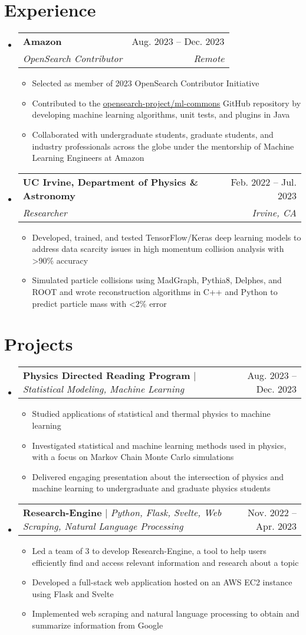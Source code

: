\documentclass[letterpaper,11pt]{article}
\makeatletter
\newcommand{\resumeItem}[1]{
  \item\small{
    {#1 \vspace{-2pt}}
  }
}
\newcommand{\resumeSubheading}[4]{
  \vspace{-2pt}\item
    \begin{tabular*}{0.97\textwidth}[t]{l@{\extracolsep{\fill}}r}
      \textbf{#1} & #2 \\
      \textit{\small#3} & \textit{\small #4} \\
    \end{tabular*}\vspace{-7pt}
}
\newcommand{\resumeProjectHeading}[2]{
    \item
    \begin{tabular*}{0.97\textwidth}{l@{\extracolsep{\fill}}r}
      \small#1 & #2 \\
    \end{tabular*}\vspace{-7pt}
}
\newcommand{\resumeSubHeadingListStart}{\begin{itemize}[leftmargin=0.15in, label={}]}
\newcommand{\resumeSubHeadingListEnd}{\end{itemize}}
\newcommand{\resumeItemListStart}{\begin{itemize}}
\newcommand{\resumeItemListEnd}{\end{itemize}\vspace{-5pt}}
\makeatother
\begin{document}
\section{Experience}
  \resumeSubHeadingListStart
    \resumeSubheading
      {Amazon}{Aug. 2023 -- Dec. 2023}
      {OpenSearch Contributor}{Remote}
      \resumeItemListStart
        \resumeItem{Selected as member of 2023 OpenSearch Contributor Initiative}
        \resumeItem{Contributed to the \href{https://github.com/opensearch-project/ml-commons/}{\underline{opensearch-project/ml-commons}} GitHub repository by developing machine learning algorithms, unit tests, and plugins in Java}
        \resumeItem{Collaborated with undergraduate students, graduate students, and industry professionals across the globe under the mentorship of Machine Learning Engineers at Amazon}
      \resumeItemListEnd
  \resumeSubHeadingListEnd

  \resumeSubHeadingListStart
    \resumeSubheading
      {UC Irvine, Department of Physics \& Astronomy}{Feb. 2022 -- Jul. 2023}
      {Researcher}{Irvine, CA}
      \resumeItemListStart
        \resumeItem{Developed, trained, and tested TensorFlow/Keras deep learning models to address data scarcity issues in high momentum collision analysis with \textgreater 90\% accuracy}
        \resumeItem{Simulated particle collisions using MadGraph, Pythia8, Delphes, and ROOT and wrote reconstruction algorithms in C++ and Python to predict particle mass with \textless 2\% error}
      \resumeItemListEnd
  \resumeSubHeadingListEnd

\section{Projects}
  \resumeSubHeadingListStart
    \resumeProjectHeading
      {\textbf{Physics Directed Reading Program} $|$ \emph{Statistical Modeling, Machine Learning}}{Aug. 2023 -- Dec. 2023}
      \resumeItemListStart
        \resumeItem{Studied applications of statistical and thermal physics to machine learning}
        \resumeItem{Investigated statistical and machine learning methods used in physics, with a focus on Markov Chain Monte Carlo simulations}
        \resumeItem{Delivered engaging presentation about the intersection of physics and machine learning to undergraduate and graduate physics students}
      \resumeItemListEnd
  \resumeSubHeadingListEnd

  \resumeSubHeadingListStart
    \resumeProjectHeading
      {\textbf{Research-Engine} $|$ \emph{Python, Flask, Svelte, Web Scraping, Natural Language Processing}}{Nov. 2022 -- Apr. 2023}
      \resumeItemListStart
        \resumeItem{Led a team of 3 to develop Research-Engine, a tool to help users efficiently find and access relevant information and research about a topic}
        \resumeItem{Developed a full-stack web application hosted on an AWS EC2 instance using Flask and Svelte}
        \resumeItem{Implemented web scraping and natural language processing to obtain and summarize information from Google}
      \resumeItemListEnd
  \resumeSubHeadingListEnd
\end{document}
